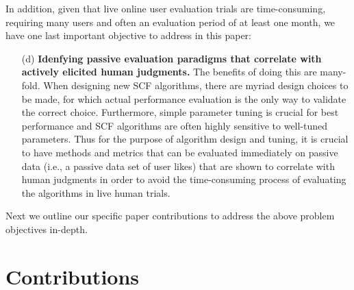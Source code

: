 In addition, given that live online user evaluation trials are
time-consuming, requiring many users and often an evaluation period of
at least one month, we have one last important objective to address in
this paper:
\begin{enumerate}
\item[(d)] {\bf Idenfying passive evaluation paradigms that correlate
with actively elicited human judgments.}  The benefits of doing this
are many-fold.  When designing new SCF algorithms, there are myriad
design choices to be made, for which actual performance evaluation is
the only way to validate the correct choice.  Furthermore, simple
parameter tuning is crucial for best performance and SCF algorithms
are often highly sensitive to well-tuned parameters.  Thus for the
purpose of algorithm design and tuning, it is crucial to have methods
and metrics that can be evaluated immediately on passive data (i.e., a
passive data set of user likes) that are shown to correlate with human
judgments in order to avoid the time-consuming process of evaluating
the algorithms in live human trials.
\end{enumerate}

Next we outline our specific paper contributions to address
the above problem objectives in-depth.

\section{Contributions}

\label{sec:Contributions}

